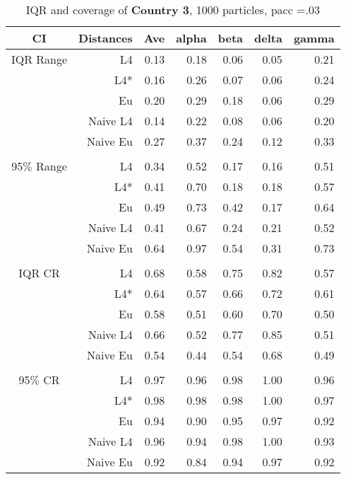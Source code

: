 \documentclass[a4paper,12pt,twoside]{book}
\begin{document}
\begin{table}[H]
\centering
\caption{IQR and coverage of \textbf{Country 3}, 1000 particles, pacc =.03}

\begin{tabular}{crrrrrr}
  \hline
{\color{blue}CI} & Distances & Ave & alpha & beta & delta & gamma \\ 
  \hline
{\color{blue}IQR Range} & L4  &0.13 & 0.18 & 0.06 & 0.05 & 0.21 \\ 
  
&L4*  &0.16 & 0.26 & 0.07 & 0.06 & 0.24 \\ 
  
&Eu &  0.20 & 0.29 & 0.18 & 0.06 & 0.29 \\ 
  
&Naive L4&    0.14 & 0.22 & 0.08 & 0.06 & 0.20 \\
  
&Naive Eu &     0.27 & 0.37 & 0.24 & 0.12 & 0.33 \\ 
   \\ 
    {\color{blue}95$\%$ Range} & L4  &0.34 & 0.52 & 0.17 & 0.16 & 0.51 \\ 
  
    &L4*  & 0.41 & 0.70 & 0.18 & 0.18 & 0.57 \\ 
 
&Eu &  0.49 & 0.73 & 0.42 & 0.17 & 0.64 \\ 
  
&Naive L4&      0.41 & 0.67 & 0.24 & 0.21 & 0.52 \\
 
&Naive Eu &     0.64 & 0.97 & 0.54 & 0.31 & 0.73 \\ 
\\   
   \hline
   
{\color{blue} IQR CR } & L4  &0.68 & 0.58 & 0.75 & 0.82 & 0.57 \\ 
  
&L4*  &  0.64 & 0.57 & 0.66 & 0.72 & 0.61 \\ 
  
&Eu &    0.58 & 0.51 & 0.60 & 0.70 & 0.50 \\ 
  
  
&Naive L4& 0.66 & 0.52 & 0.77 & 0.85 & 0.51 \\ 
 
&Naive Eu &  0.54 & 0.44 & 0.54 & 0.68 & 0.49 \\ \\
  

 {\color{blue} 95$\%$ CR }& L4  &0.97 & 0.96 & 0.98 & 1.00 & 0.96 \\ 
  
  &L4*  & 0.98 & 0.98 & 0.98 & 1.00 & 0.97 \\ 
   
&Eu &  0.94 & 0.90 & 0.95 & 0.97 & 0.92 \\ 

  
&Naive L4&    
  0.96 & 0.94 & 0.98 & 1.00 & 0.93 \\
&Naive Eu &   0.92 & 0.84 & 0.94 & 0.97 & 0.92 \\ 
\end{tabular}

\end{table}
\end{document}
